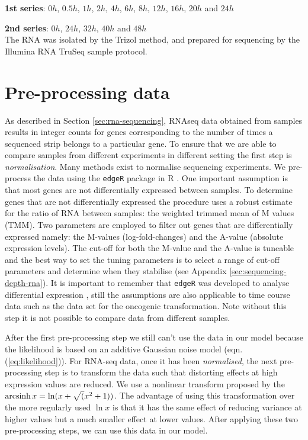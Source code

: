 \textbf{1st series}: $0h$, $0.5h$, $1h$, $2h$, $4h$, $6h$, $8h$, $12h$, $16h$, $20h$ and $24h$

\textbf{2nd series}: $0h$, $24h$, $32h$, $40h$ and $48h$ \\
The RNA was isolated by the Trizol method, and prepared for sequencing by the Illumina RNA TruSeq sample protocol.


\section{Pre-processing data}
\label{sec:norm-stand}

As described in Section \ref{sec:rna-sequencing}, RNAseq data obtained from samples results in integer counts for genes corresponding to the number of times a sequenced strip belongs to a particular gene. To ensure that we are able to compare samples from different experiments in different setting the first step is \emph{normalisation}. Many methods exist to normalise sequencing experiments. We pre-process the data using the \texttt{edgeR} package in R \citep{McCarthy:2012wg,Robinson:2010cw}. One important assumption is that most genes are not differentially expressed between samples. To determine genes that are not differentially expressed the procedure uses a robust estimate for the ratio of RNA between samples: the weighted trimmed mean of M values (TMM). Two parameters are employed to filter out genes that are differentially expressed namely: the M-values (log-fold-changes) and the A-value (absolute expression levels). The cut-off for both the M-value and the A-value is tuneable and the best way to set the tuning parameters is to select a range of cut-off parameters and determine when they stabilise (see Appendix \ref{sec:sequencing-depth-rna}). It is important to remember that \texttt{edgeR} was developed to analyse differential expression \citep{Robinson:2010dd}, still the assumptions are also applicable to time course data such as the data set for the oncogenic transformation. Note without this step it is not possible to compare data from different samples.

After the first pre-processing step we still can't use the data in our model because the likelihood is based on an additive Gaussian noise model (eqn. (\ref{eq:likelihood})). For RNA-seq data, once it has been \emph{normalised}, the next pre-processing step is to transform the data such that distorting effects at high expression values are reduced. We use a nonlinear transform proposed by \cite{Hoffman:2012gn} the $\operatorname{arcsinh} x = \ln(x + \sqrt (x^2 + 1))$. The advantage of using this transformation over the more regularly used $\ln x$ is that it has the same effect of reducing variance at higher values but a much smaller effect at lower values. After applying these two pre-processing steps, we can use this data in our model.

